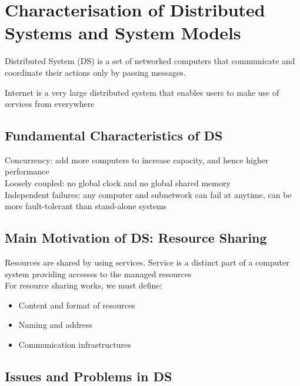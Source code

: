 \chapter{Characterisation of Distributed Systems and System Models}

\begin{multicols*}{2}

\noindent Distributed System (DS) is a set of networked computers that communicate and coordinate their actions only by passing messages.

\noindent Internet is a very large distributed system that enables users to make use of services from everywhere

\section{Fundamental Characteristics of DS}

\noindent Concurrency: add more computers to increase capacity, and hence higher performance \\

\noindent Loosely coupled: no global clock and no global shared memory \\

\noindent Independent failures: any computer and subnetwork can fail at anytime, can be more fault-tolerant than stand-alone systems

\section {Main Motivation of DS: Resource Sharing}

\noindent Resources are shared by using services. Service is a distinct part of a computer system providing accesses to the managed resources \\

\noindent For resource sharing works, we must define:
\begin{itemize}
    \item Content and format of resources
    \item Naming and address
    \item Communication infrastructures
\end{itemize}

\section{Issues and Problems in DS}


\end{multicols*}
